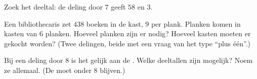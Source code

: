 \begin{exercise}[$\star$]\label{exo:g4:division:9}
Zoek het deeltal: de deling door $7$ geeft  $58$ en  $3$.
\end{exercise}

\begin{exercise}[$\star\star$]\label{exo:g4:division:10}
Een bibliothecaris zet $438$ boeken in de kast, $9$ per plank. Planken
komen in kasten van $6$ planken. Hoeveel planken zijn er nodig? Hoeveel
kasten moeten er gekocht worden? (Twee delingen, beide met een vraag van
het type ``plus één''.)
\end{exercise}

\begin{exercise}[$\star\star$]\label{exo:g4:division:11}
Bij een deling door $8$ is het  gelijk aan de . Welke deeltallen
zijn mogelijk? Noem ze allemaal. (De  moet onder $8$ blijven.)
\end{exercise}
